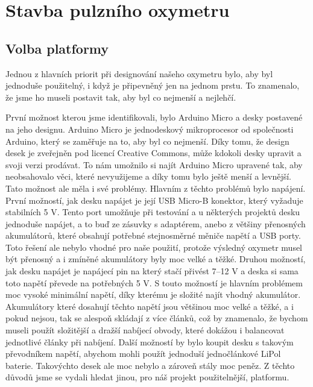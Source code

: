 \section {Stavba pulzního oxymetru}
\subsection {Volba platformy}
Jednou z hlavních priorit při designování našeho oxymetru bylo, aby byl jednoduše použitelný, i když je připevněný jen na jednom prstu. To znamenalo, že jsme ho museli postavit tak, aby byl co nejmenší a nejlehčí.
\par První možnost kterou jsme identifikovali, bylo Arduino Micro a desky postavené na jeho designu. Arduino Micro je jednodeskový mikroprocesor od společnosti Arduino, který se zaměřuje na to, aby byl co nejmenší. Díky tomu, že design desek je zveřejněn pod licencí Creative Commons, může kdokoli desky upravit a svoji verzi prodávat. To nám umožnilo si najít Arduino Micro upravené tak, aby neobsahovalo věci, které nevyužijeme a díky tomu bylo ještě menší a levnější. Tato možnost ale měla i své problémy. Hlavním z těchto problémů bylo napájení. První možností, jak desku napájet je její USB Micro-B konektor, který vyžaduje stabilních 5 V. Tento port umožňuje při testování a u některých projektů desku jednoduše napájet, a to buď ze zásuvky s adaptérem, anebo z většiny přenosných akumulátorů, které obsahují potřebné stejnosměrné měniče napětí a USB porty. Toto řešení ale nebylo vhodné pro naše použití, protože výsledný oxymetr musel být přenosný a i zmíněné akumulátory byly moc velké a těžké. Druhou možností, jak desku napájet je napájecí pin na který stačí přivést 7–12 V a deska si sama toto napětí převede na potřebných 5 V. S touto možností je hlavním problémem moc vysoké minimální napětí, díky kterému je složité najít vhodný akumulátor. Akumulátory které dosahují těchto napětí jsou většinou moc velké a těžké, a i pokud nejsou, tak se alespoň skládají z více článků, což by znamenalo, že bychom museli použít složitější a dražší nabíjecí obvody, které dokážou i balancovat jednotlivé články při nabíjení. Další možností by bylo koupit desku s takovým převodníkem napětí, abychom mohli použít jednoduší jednočlánkové LiPol baterie. Takovýchto desek ale moc nebylo a zároveň stály moc peněz. Z těchto důvodů jsme se vydali hledat jinou, pro náš projekt použitelnější, platformu.
